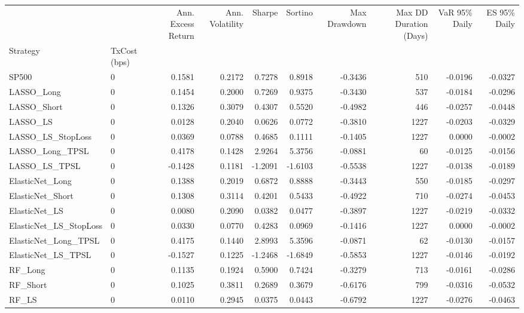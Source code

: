 \begin{tabular}{llrrrrrrrr}
\toprule
 &  & Ann. Excess Return & Ann. Volatility & Sharpe & Sortino & Max Drawdown & Max DD Duration (Days) & VaR 95\% Daily & ES 95\% Daily \\
Strategy & TxCost (bps) &  &  &  &  &  &  &  &  \\
\midrule
SP500 & 0 & 0.1581 & 0.2172 & 0.7278 & 0.8918 & -0.3436 & 510 & -0.0196 & -0.0327 \\
\cline{1-10}
LASSO\_Long & 0 & 0.1454 & 0.2000 & 0.7269 & 0.9375 & -0.3430 & 537 & -0.0184 & -0.0296 \\
\cline{1-10}
LASSO\_Short & 0 & 0.1326 & 0.3079 & 0.4307 & 0.5520 & -0.4982 & 446 & -0.0257 & -0.0448 \\
\cline{1-10}
LASSO\_LS & 0 & 0.0128 & 0.2040 & 0.0626 & 0.0772 & -0.3810 & 1227 & -0.0203 & -0.0329 \\
\cline{1-10}
LASSO\_LS\_StopLoss & 0 & 0.0369 & 0.0788 & 0.4685 & 0.1111 & -0.1405 & 1227 & 0.0000 & -0.0002 \\
\cline{1-10}
LASSO\_Long\_TPSL & 0 & 0.4178 & 0.1428 & 2.9264 & 5.3756 & -0.0881 & 60 & -0.0125 & -0.0156 \\
\cline{1-10}
LASSO\_LS\_TPSL & 0 & -0.1428 & 0.1181 & -1.2091 & -1.6103 & -0.5538 & 1227 & -0.0138 & -0.0189 \\
\cline{1-10}
ElasticNet\_Long & 0 & 0.1388 & 0.2019 & 0.6872 & 0.8888 & -0.3443 & 550 & -0.0185 & -0.0297 \\
\cline{1-10}
ElasticNet\_Short & 0 & 0.1308 & 0.3114 & 0.4201 & 0.5433 & -0.4922 & 710 & -0.0274 & -0.0453 \\
\cline{1-10}
ElasticNet\_LS & 0 & 0.0080 & 0.2090 & 0.0382 & 0.0477 & -0.3897 & 1227 & -0.0219 & -0.0332 \\
\cline{1-10}
ElasticNet\_LS\_StopLoss & 0 & 0.0330 & 0.0770 & 0.4283 & 0.0969 & -0.1416 & 1227 & 0.0000 & -0.0002 \\
\cline{1-10}
ElasticNet\_Long\_TPSL & 0 & 0.4175 & 0.1440 & 2.8993 & 5.3596 & -0.0871 & 62 & -0.0130 & -0.0157 \\
\cline{1-10}
ElasticNet\_LS\_TPSL & 0 & -0.1527 & 0.1225 & -1.2468 & -1.6849 & -0.5853 & 1227 & -0.0146 & -0.0192 \\
\cline{1-10}
RF\_Long & 0 & 0.1135 & 0.1924 & 0.5900 & 0.7424 & -0.3279 & 713 & -0.0161 & -0.0286 \\
\cline{1-10}
RF\_Short & 0 & 0.1025 & 0.3811 & 0.2689 & 0.3679 & -0.6176 & 799 & -0.0316 & -0.0532 \\
\cline{1-10}
RF\_LS & 0 & 0.0110 & 0.2945 & 0.0375 & 0.0443 & -0.6792 & 1227 & -0.0276 & -0.0463 \\

\end{tabular}
